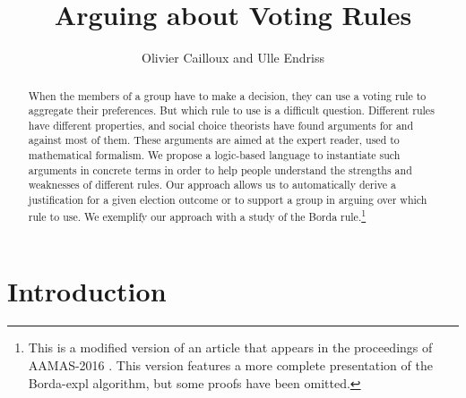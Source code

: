 \documentclass{comsoc2016}
\title{Arguing about Voting Rules}
\author{Olivier Cailloux and Ulle Endriss}
\begin{document}

\renewcommand{\phi}{\varphi} %

\begin{abstract}
When the members of a group have to make a decision, they can use a voting rule to aggregate their preferences. But which rule to use is a difficult question. Different rules have different properties, and social choice theorists have found arguments for and against most of them. These arguments are aimed at the expert reader, used to mathematical formalism. We propose a logic-based language to instantiate such arguments in concrete terms in order to help people understand the strengths and weaknesses of different rules. Our approach allows us to automatically derive a justification for a given election outcome or to support a group in arguing over which rule to use. We exemplify our approach with a study of the Borda rule.\footnote{This is a modified version of an article that appears in the proceedings of AAMAS-2016 \citep{cailloux_arguing_2016}. This version features a more complete presentation of the Borda-expl algorithm, but some proofs have been omitted.}
\end{abstract}

\section{Introduction}
\end{document}
